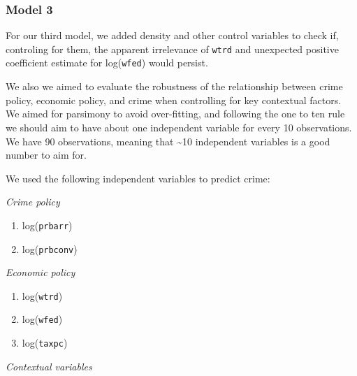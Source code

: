 \documentclass[]{article}
\begin{document}
\hypertarget{model-3}{%
\subsubsection{Model 3}\label{model-3}}

For our third model, we added density and other control variables to
check if, controling for them, the apparent irrelevance of \texttt{wtrd}
and unexpected positive coefficient estimate for log(\texttt{wfed})
would persist.

We also we aimed to evaluate the robustness of the relationship between
crime policy, economic policy, and crime when controlling for key
contextual factors. We aimed for parsimony to avoid over-fitting, and
following the one to ten rule we should aim to have about one
independent variable for every 10 observations. We have 90 observations,
meaning that \textasciitilde{}10 independent variables is a good number
to aim for.

We used the following independent variables to predict crime:

\emph{Crime policy}

\begin{enumerate}
\def\labelenumi{(\arabic{enumi})}
\item
  log(\texttt{prbarr})
\item
  log(\texttt{prbconv})
\end{enumerate}

\emph{Economic policy}

\begin{enumerate}
\def\labelenumi{(\arabic{enumi})}
\setcounter{enumi}{2}
\item
  log(\texttt{wtrd})
\item
  log(\texttt{wfed})
\item
  log(\texttt{taxpc})
\end{enumerate}

\emph{Contextual variables}
\end{document}
